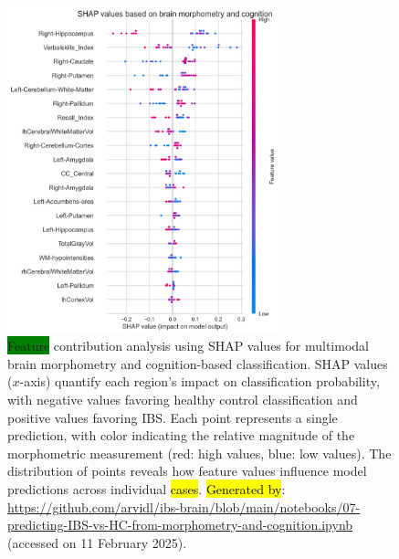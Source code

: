 \documentclass[diagnostics,article,accept,pdftex,moreauthors]{Definitions/mdpi}
\newcommand{\highlight}[1]{\colorbox{green}{#1}}
\begin{document}
\begin{figure}[H]
\includegraphics[width=0.70\textwidth]{figs/SHAP_summary_plot_IBS_aseg_and_rbans.png}
\caption{{{\highlight{Feature} %
 contribution analysis using SHAP values for multimodal brain morphometry and cognition-based classification}}. {SHAP values}  ($x$-axis) quantify each region's impact on classification probability, with negative values favoring healthy control classification and positive values favoring IBS. Each point represents a single prediction, with color indicating the relative magnitude of the morphometric measurement (red: high values, blue: low values). The distribution of points reveals how feature values influence model predictions across individual \hl{cases}. %
{\hl{Generated by}: {{\url{https://github.com/arvidl/ibs-brain/blob/main/notebooks/07-predicting-IBS-vs-HC-from-morphometry-and-cognition.ipynb}}}} (accessed on 11 February 2025).}
\label{fig:SHAP-values-multimodal}
\end{figure} 
\end{document}

